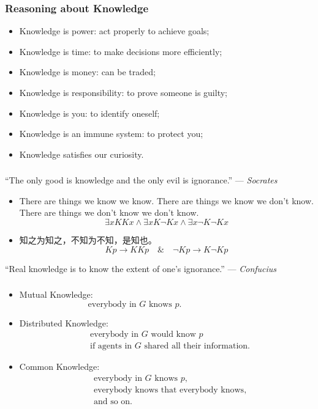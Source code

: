 \documentclass[UTF8,aspectratio=43,11pt,colorlinks,compress,openany]{beamer}%
\begin{document}
\begin{frame}\frametitle{Reasoning about Knowledge}
\begin{itemize}
	\item Knowledge is power: act properly to achieve goals;
	\item Knowledge is time: to make decisions more efficiently;
	\item Knowledge is money: can be traded;
	\item Knowledge is responsibility: to prove someone is guilty;
	\item Knowledge is you: to identify oneself;
	\item Knowledge is an immune system: to protect you;
	\item Knowledge satisfies our curiosity.
\end{itemize}
\end{frame}

\begin{frame}\frametitle{}
``The only good is knowledge and the only evil is ignorance.'' --- \textsl{Socrates}
\begin{center}
\end{center}
\begin{itemize}
\item There are things we know we know. There are things we know we don't know. There are things we don't know we don't know.
\[\exists xKKx\wedge \exists xK\neg Kx\wedge \exists x\neg K\neg Kx\]
\item 知之为知之，不知为不知，是知也。
\[Kp\to KKp\quad\&\quad\neg Kp\to K\neg Kp\]
\end{itemize}
``Real knowledge is to know the extent of one's ignorance.'' --- \textsl{Confucius}
\end{frame}

\begin{frame}\frametitle{}
\begin{itemize}
	\item Mutual Knowledge:
	\[\text{everybody in $G$ knows $p$.}\phantom{everyone knows it}\]
	\item Distributed Knowledge:
	\[\begin{aligned}
		&\text{everybody in $G$ would know $p$}\\
		&\text{if agents in $G$ shared all their information.}
	\end{aligned}\]
	\item Common Knowledge:
	\[\begin{aligned}
		&\text{everybody in $G$ knows $p$,}\\
		&\text{everybody knows that everybody knows,}\\
		&\text{and so on.}
	\end{aligned}\]
\end{itemize}
\end{frame}
\end{document}
